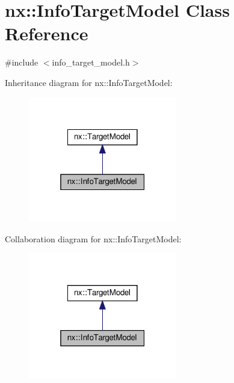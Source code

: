 \hypertarget{classnx_1_1InfoTargetModel}{}\section{nx\+:\+:Info\+Target\+Model Class Reference}
\label{classnx_1_1InfoTargetModel}


{\ttfamily \#include $<$info\+\_\+target\+\_\+model.\+h$>$}



Inheritance diagram for nx\+:\+:Info\+Target\+Model\+:
\nopagebreak
\begin{figure}[H]
\begin{center}
\leavevmode
\includegraphics[width=184pt]{classnx_1_1InfoTargetModel__inherit__graph}
\end{center}
\end{figure}


Collaboration diagram for nx\+:\+:Info\+Target\+Model\+:
\nopagebreak
\begin{figure}[H]
\begin{center}
\leavevmode
\includegraphics[width=184pt]{classnx_1_1InfoTargetModel__coll__graph}
\end{center}
\end{figure}
